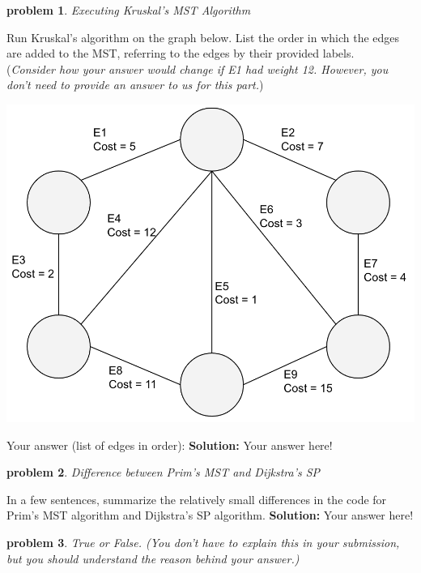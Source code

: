 \documentclass[10pt]{article}
\newcommand{\solution}[1]{\color{blue}\hfill\break\noindent\textbf{Solution:} #1\color{black}}
\newtheorem{problem}{\sc\color{cit}problem}
\begin{document}
\newpage 
\begin{problem} Executing Kruskal's MST Algorithm \end{problem}
Run Kruskal's algorithm on the graph below. List the order in which the edges are added to the MST, referring to the edges by their provided labels. \\
(\emph{Consider how your answer would change if E1 had weight 12.  However, you don't need to provide an answer to us for this part.})

\includegraphics[scale=0.4]{graph_MST1}

Your answer (list of edges in order):
\solution{
    Your answer here!
}

\begin{problem} Difference between Prim's MST and Dijkstra's SP \end{problem}
In a few sentences, summarize the relatively small differences in the code for Prim's MST algorithm and Dijkstra's SP algorithm.
\solution{
    Your answer here!
}

\begin{problem} True or False. (You don't have to explain this in your submission, but you should understand the reason behind your answer.)  \end{problem}
\end{document}

